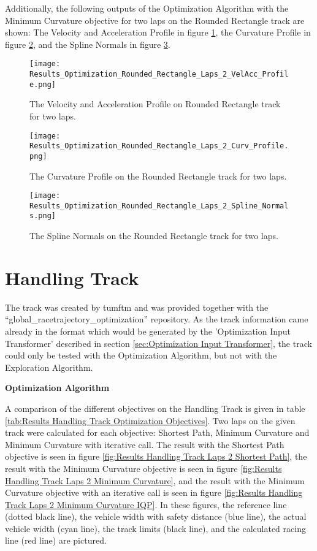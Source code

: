 Additionally, the following outputs of the Optimization Algorithm with the Minimum Curvature objective for two laps on the Rounded Rectangle track are shown: The Velocity and Acceleration Profile in figure \ref{fig:Results Rounded Rectangle Laps 2 VelAcc Profile}, the Curvature Profile in figure \ref{fig:Results Rounded Rectangle Laps 2 Curv Profile}, and the Spline Normals in figure \ref{fig:Results Rounded Rectangle Laps 2 Spline Normals}.
\begin{figure}[H]
    \centering
    \texttt{[image: Results\_Optimization\_Rounded\_Rectangle\_Laps\_2\_VelAcc\_Profile.png]}
    \caption{The Velocity and Acceleration Profile on Rounded Rectangle track for two laps.}
    \label{fig:Results Rounded Rectangle Laps 2 VelAcc Profile}
\end{figure}
\begin{figure}[H]
    \centering
    \texttt{[image: Results\_Optimization\_Rounded\_Rectangle\_Laps\_2\_Curv\_Profile.png]}
    \caption{The Curvature Profile on the Rounded Rectangle track for two laps.}
    \label{fig:Results Rounded Rectangle Laps 2 Curv Profile}
\end{figure}
\begin{figure}[H]
    \centering
    \texttt{[image: Results\_Optimization\_Rounded\_Rectangle\_Laps\_2\_Spline\_Normals.png]}
    \caption{The Spline Normals on the Rounded Rectangle track for two laps.}
    \label{fig:Results Rounded Rectangle Laps 2 Spline Normals}
\end{figure}

\pagebreak

\section{Handling Track} \label{sec:Results Handling Track}
The track was created by \acrshort{tumftm} and was provided together with the ``global\_racetrajectory\_optimization'' repository. \cite{tumftm_optimization_algoritm}
As the track information came already in the format which would be generated by the 'Optimization Input Transformer' described in section \ref{sec:Optimization Input Transformer}, the track could only be tested with the Optimization Algorithm, but not with the Exploration Algorithm.

\textbf{Optimization Algorithm}

A comparison of the different objectives on the Handling Track is given in table \ref{tab:Results Handling Track Optimization Objectives}. Two laps on the given track were calculated for each objective: Shortest Path, Minimum Curvature and Minimum Curvature with iterative call. The result with the Shortest Path objective is seen in figure \ref{fig:Results Handling Track Laps 2 Shortest Path}, the result with the Minimum Curvature objective is seen in figure \ref{fig:Results Handling Track Laps 2 Minimum Curvature}, and the result with the Minimum Curvature objective with an iterative call is seen in figure \ref{fig:Results Handling Track Laps 2 Minimum Curvature IQP}. In these figures, the reference line (dotted black line), the vehicle width with safety distance (blue line), the actual vehicle width (cyan line), the track limits (black line), and the calculated racing line (red line) are pictured.

